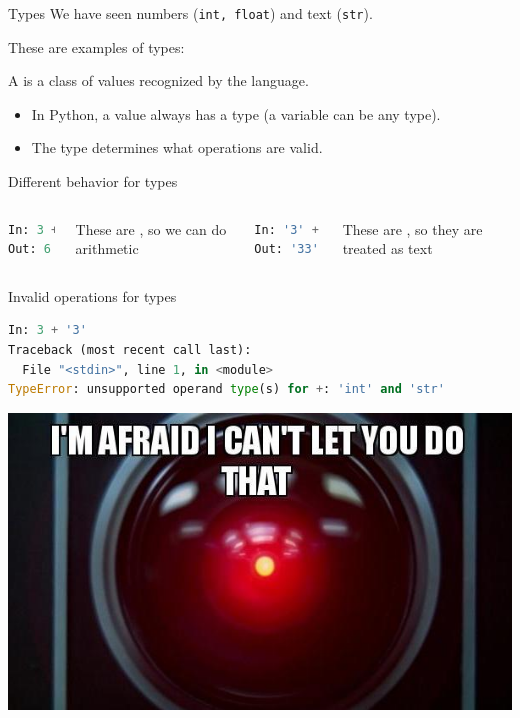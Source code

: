 \documentclass[aspectratio=169,usenames,dvipsnames]{beamer}
\begin{document}
\begin{frame}{Types}
    We have seen numbers (\lstinline{int, float}) and text (\lstinline{str}).

    These are examples of types:

    \begin{definition}
        A  is a class of values recognized by the language.
    \end{definition}
    
    \pause
    \begin{itemize}
        \item In Python, a value always has a type (a variable can be any type).
        \item The type determines what operations are valid.
    \end{itemize}
\end{frame}

\begin{frame}[fragile]{Different behavior for types}
    \begin{columns}
\begin{lstlisting}[language=python]
In: 3 + 3
Out: 6
\end{lstlisting}

These are , so we can do arithmetic
\begin{lstlisting}[language=python]
In: '3' + '3'
Out: '33'
\end{lstlisting}

These are , so they are treated as text
    \end{columns}
\end{frame}

\begin{frame}[fragile]{Invalid operations for types}
\begin{lstlisting}[language=python]
In: 3 + '3'
Traceback (most recent call last):
  File "<stdin>", line 1, in <module>
TypeError: unsupported operand type(s) for +: 'int' and 'str'
\end{lstlisting}
    
    \centering
    \includegraphics[height=0.5\textheight]{fig/cantdothat}
\end{frame}
    
\end{document}
